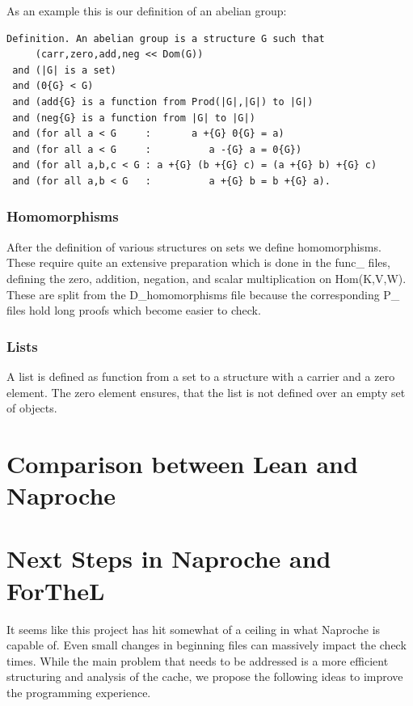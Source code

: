 \documentclass[11pt]{article}
\begin{document}
As an example this is our definition of an abelian group:

\begin{lstlisting}
Definition. An abelian group is a structure G such that
     (carr,zero,add,neg << Dom(G))
 and (|G| is a set)
 and (0{G} < G)
 and (add{G} is a function from Prod(|G|,|G|) to |G|)
 and (neg{G} is a function from |G| to |G|)
 and (for all a < G     :       a +{G} 0{G} = a)
 and (for all a < G     :          a -{G} a = 0{G})
 and (for all a,b,c < G : a +{G} (b +{G} c) = (a +{G} b) +{G} c)
 and (for all a,b < G   :          a +{G} b = b +{G} a). 
\end{lstlisting}


\subsubsection{Homomorphisms}

After the definition of various structures on sets we define homomorphisms. These require quite an extensive preparation which is done in the func\_ files, defining the zero, addition, negation, and scalar multiplication on Hom(K,V,W). These are split from the D\_homomorphisms file because the corresponding P\_ files hold long proofs which become easier to check.

\subsubsection{Lists}

A list is defined as function from a set to a structure with a carrier and a zero element. The zero element ensures, that the list is not defined over an empty set of objects. 

\section{Comparison between Lean and Naproche}


\section{Next Steps in Naproche and ForTheL}

It seems like this project has hit somewhat of a ceiling in what Naproche is capable of. 
Even small changes in beginning files can massively impact the check times.
While the main problem that needs to be addressed is a more efficient structuring and analysis of the cache, we propose the following ideas to improve the programming experience.
\end{document}
